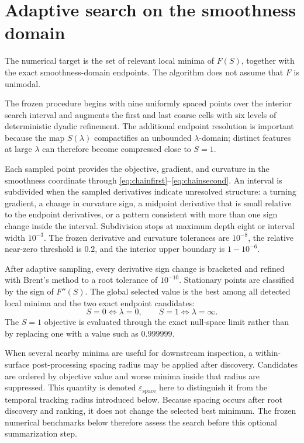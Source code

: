 \documentclass[english]{smcca}
\begin{document}
\section{Adaptive search on the smoothness domain}

The numerical target is the set of relevant local minima of \(F(S)\), together with the exact smoothness-domain endpoints. The algorithm does not assume that \(F\) is unimodal.

The frozen procedure begins with nine uniformly spaced points over the interior search interval and augments the first and last coarse cells with six levels of deterministic dyadic refinement. The additional endpoint resolution is important because the map \(S(\lambda)\) compactifies an unbounded \(\lambda\)-domain; distinct features at large \(\lambda\) can therefore become compressed close to \(S=1\).

Each sampled point provides the objective, gradient, and curvature in the smoothness coordinate through \eqref{eq:chainfirst}--\eqref{eq:chainsecond}. An interval is subdivided when the sampled derivatives indicate unresolved structure: a turning gradient, a change in curvature sign, a midpoint derivative that is small relative to the endpoint derivatives, or a pattern consistent with more than one sign change inside the interval. Subdivision stops at maximum depth eight or interval width \(10^{-3}\). The frozen derivative and curvature tolerances are \(10^{-8}\), the relative near-zero threshold is \(0.2\), and the interior upper boundary is \(1-10^{-6}\).

After adaptive sampling, every derivative sign change is bracketed and refined with Brent's method \cite{brent1971zero} to a root tolerance of \(10^{-10}\). Stationary points are classified by the sign of \(F''(S)\). The global selected value is the best among all detected local minima and the two exact endpoint candidates:
\[
S=0\Longleftrightarrow\lambda=0,
\qquad
S=1\Longleftrightarrow\lambda=\infty.
\]
The \(S=1\) objective is evaluated through the exact null-space limit rather than by replacing one with a value such as \(0.999999\).

When several nearby minima are useful for downstream inspection, a within-surface post-processing spacing radius may be applied after discovery. Candidates are ordered by objective value and worse minima inside that radius are suppressed. This quantity is denoted \(\varepsilon_{\mathrm{space}}\) here to distinguish it from the temporal tracking radius introduced below. Because spacing occurs after root discovery and ranking, it does not change the selected best minimum. The frozen numerical benchmarks below therefore assess the search before this optional summarization step.
\end{document}
